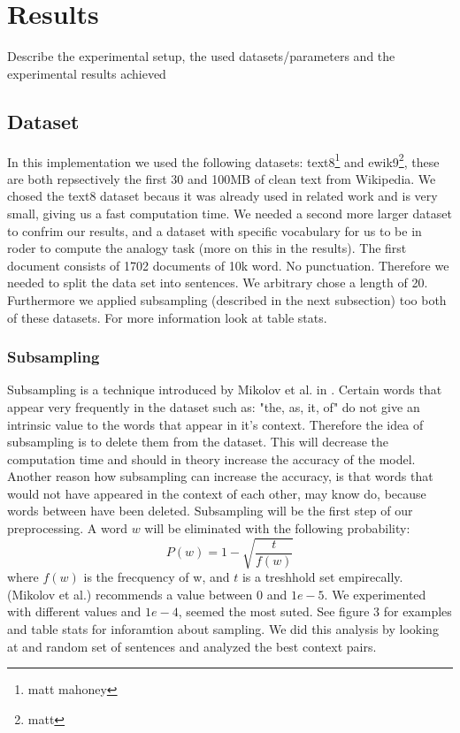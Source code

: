 \chapter{Results}\label{chap:results}


Describe the experimental setup, the used datasets/parameters and the experimental results achieved

\section{Dataset}
In this implementation we used the following datasets: text8\footnote{matt mahoney} and ewik9\footnote{matt}, these are both repsectively the first 30 and 100MB of clean text from Wikipedia. We chosed the text8 dataset becaus it was already used in related work and is very small, giving us a fast computation time. We needed a second more larger dataset to confrim our results, and a dataset with specific vocabulary for us to be in roder to compute the analogy task (more on this in the results). The first document consists of 1702 documents of 10k word. No punctuation. 
 Therefore we needed to split the data set into sentences. We arbitrary chose a length of 20. Furthermore we applied subsampling (described in the next subsection)  too both of these datasets. For more information look at table stats.
\subsection{Subsampling}
Subsampling is a technique introduced by Mikolov et al. in \cite{mikolov}. Certain words that appear very frequently in the dataset such as: "the, as, it, of" do not give an intrinsic value to the words that appear in it's context. Therefore the idea of subsampling is to delete them from the dataset. This will decrease the computation time and should in theory increase the accuracy of the model. Another reason how subsampling can increase the accuracy, is that words that would not have appeared in the context of each other, may know do, because words between have been deleted. 
Subsampling will be the first step of our preprocessing. A word $w$ will be eliminated with the following probability:
\begin{equation}
P(w) = 1- \sqrt{{\frac{t}{f(w)}}}
\end{equation}
where $f(w)$ is the frecquency of w, and $t$ is a treshhold set empirecally. (Mikolov et al.)  recommends a value between $0$ and $1e-5$. We experimented with different values and $1e-4$, seemed the most suted. See figure 3 for examples and table stats for inforamtion about sampling. We did this analysis by looking at and random set of sentences and analyzed the best context pairs. 
